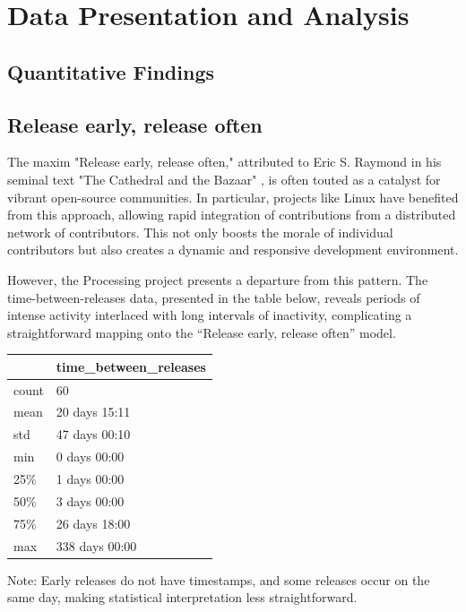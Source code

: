 \section{Data Presentation and Analysis}

\subsection{Quantitative Findings}

\subsection{Release early, release often}

The maxim "Release early, release often," attributed to Eric S. Raymond in his seminal text "The Cathedral and the Bazaar" \parencite{raymondCathedralBazaar1999}, is often touted as a catalyst for vibrant open-source communities. In particular, projects like Linux have benefited from this approach, allowing rapid integration of contributions from a distributed network of contributors. This not only boosts the morale of individual contributors but also creates a dynamic and responsive development environment.

However, the Processing project presents a departure from this pattern. The time-between-releases data, presented in the table below, reveals periods of intense activity interlaced with long intervals of inactivity, complicating a straightforward mapping onto the “Release early, release often” model.

\begin{tabular}{ll}
  \toprule
   & time\_between\_releases \\
  \midrule
  count & 60 \\
  mean & 20 days 15:11 \\
  std & 47 days 00:10 \\
  min & 0 days 00:00 \\
  25\% & 1 days 00:00 \\
  50\% & 3 days 00:00 \\
  75\% & 26 days 18:00 \\
  max & 338 days 00:00 \\
  \bottomrule
\end{tabular}

Note: Early releases do not have timestamps, and some releases occur on the same day, making statistical interpretation less straightforward.

